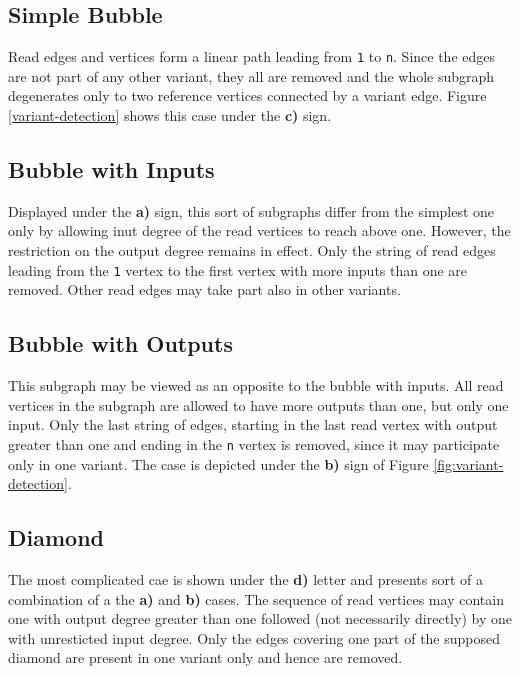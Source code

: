 \subsection{Simple Bubble}
\label{subsec:simple-bubble}

Read edges and vertices form a linear path leading from \texttt{1} to \texttt{n}. Since the edges are not part of any other variant, they all are removed and the whole subgraph degenerates only to two reference vertices connected by a variant edge. Figure \ref{variant-detection} shows this case under the \textbf{c)} sign.

\subsection{Bubble with Inputs}
\label{subsec:bubble-with-inputs}

Displayed under the \textbf{a)} sign, this sort of subgraphs differ from the simplest one only by allowing inut degree of the read vertices to reach above one. However, the restriction on the output degree remains in effect. Only the string of read edges leading from the \texttt{1} vertex to the first vertex with more inputs than one are removed. Other read edges may take part also in other variants.

\subsection{Bubble with Outputs}
\label{subsec:bubble-with-outputs}

This subgraph may be viewed as an opposite to the bubble with inputs. All read vertices in the subgraph are allowed to have more outputs than one, but only one input. Only the last string of edges, starting in the last read vertex with output greater than one and ending in the \texttt{n} vertex is removed, since it may participate only in one variant. The case is depicted under the \textbf{b)} sign of Figure \ref{fig:variant-detection}.

\subsection{Diamond}
\label{subsec:diamond}

The most complicated cae is shown under the \textbf{d)} letter and presents sort of a combination of a the \textbf{a)} and \textbf{b)} cases. The sequence of read vertices may contain one with output degree greater than one followed (not necessarily directly) by one with unresticted input degree. Only the edges covering one part of the supposed diamond are present in one variant only and hence are removed. 

